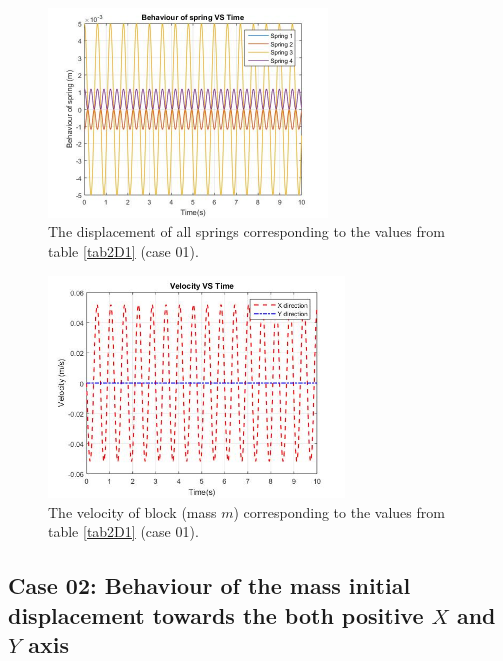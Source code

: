  \begin{figure}[hbt!]
	\centering
	\begin{framed}
	\includegraphics[width=0.66\textwidth]{Figures/2DA.jpg}
	\end{framed}
	\caption{ The displacement of all springs corresponding to the values from table \ref{tab2D1} (case 01). }
	\label{fig:R5}
\end{figure}

 \begin{figure}[hbt!]
	\centering
	\begin{framed}
	\includegraphics[width=0.7\textwidth]{Figures/2DV.jpg}
		\end{framed}
	\caption{ The velocity of block (mass $m$) corresponding to the values from table \ref{tab2D1} (case 01). }
	\label{fig:R5}
\end{figure}

\newpage

\subsection{Case 02:  Behaviour of the mass initial displacement towards the both positive $X$ and $Y$ axis }
\paragraph{}

